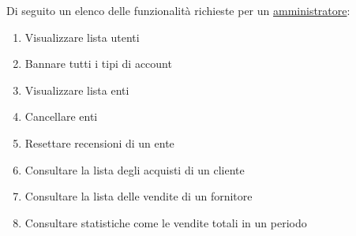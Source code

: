 \vspace{0.5cm}

Di seguito un elenco delle funzionalità richieste per un \ul{amministratore}:
\begin{enumerate}[label=c\arabic*)]
    \item Visualizzare lista utenti
    \item Bannare tutti i tipi di account
    
    \item Visualizzare lista enti
    \item Cancellare enti
    \item Resettare recensioni di un ente

    
    \item Consultare la lista degli acquisti di un cliente
    \item Consultare la lista delle vendite di un fornitore
    
    \item Consultare statistiche come le vendite totali in un periodo
    
\end{enumerate}